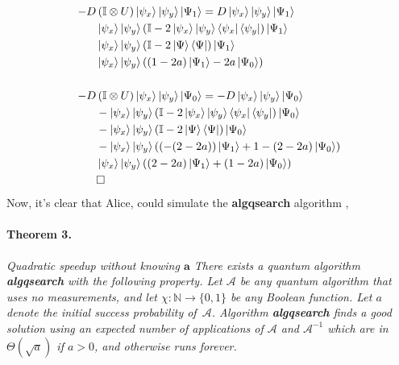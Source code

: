 \documentclass{article}
\begin{document}
\begin{multicols*}{2}
    \begin{equation*}
      \begin{split}
    - D & \left( \mathbb{I} \otimes U \right)  \ket{\psi_{x}}\ket{\psi_{y}} \ket{\Psi_1} =    D  \ket{\psi_{x}}\ket{\psi_{y}} \ket{\Psi_1} \\
  &  \ket{\psi_{x}}\ket{\psi_{y}} \left( \mathbb{I} - 2 \ket{\psi_{x}}\ket{\psi_{y}} \bra{ \psi_{x}}\bra{\psi_{y}} \right) \ket{\Psi_1} \\
  &  \ket{\psi_{x}}\ket{\psi_{y}} \left( \mathbb{I} - 2 \ket{\Psi} \bra{\Psi} \right) \ket{\Psi_1}  \\ 
  &  \ket{\psi_{x}}\ket{\psi_{y}} \left( \left( 1 - 2a  \right)\ket{\Psi_1} - 2a \ket{\Psi_0} \right) \\ 
  & \\ 
  - D & \left( \mathbb{I} \otimes U \right)  \ket{\psi_{x}}\ket{\psi_{y}} \ket{\Psi_0} =   - D  \ket{\psi_{x}}\ket{\psi_{y}} \ket{\Psi_0} \\
  &  - \ket{\psi_{x}}\ket{\psi_{y}} \left( \mathbb{I} - 2 \ket{\psi_{x}}\ket{\psi_{y}} \bra{ \psi_{x}}\bra{\psi_{y}} \right) \ket{\Psi_0} \\
  &  - \ket{\psi_{x}}\ket{\psi_{y}} \left( \mathbb{I} - 2 \ket{\Psi} \bra{\Psi} \right) \ket{\Psi_0} \\ 
  &  - \ket{\psi_{x}}\ket{\psi_{y}} \left( \left(  - (2-2a)  \right)\ket{\Psi_1} + 1 -(2 - 2a) \ket{\Psi_0} \right) \\ 
  & \ket{\psi_{x}}\ket{\psi_{y}} \left( \left( 2-2a \right)\ket{\Psi_1} + \left(1  - 2a\right) \ket{\Psi_0} \right) \\ 
  & \square
\end{split}
\end{equation*}
Now, it's clear that Alice, could simulate the \textbf{algqsearch} algorithm \cite{Brassard_2002}, 

\paragraph{Theorem 3.} \textit{Quadratic speedup without knowing $\mathbf{a}$
There exists a quantum algorithm \textbf{algqsearch} with the following property.
Let $\mathcal A$ be any quantum algorithm that uses no measurements,
and let $\chi : \mathbb{N}  \rightarrow \{0,1\}$ be any Boolean function.
Let $a$ denote the initial success probability of~$\mathcal A$.
Algorithm \textbf{algqsearch} finds a good solution using an expected number
of applications of $\mathcal A$ and ${\mathcal A}^{-1}$ which are in
$\Theta(\sqrt a)$ if $a>0$, and otherwise runs forever.}


\end{multicols*}
\end{document}
